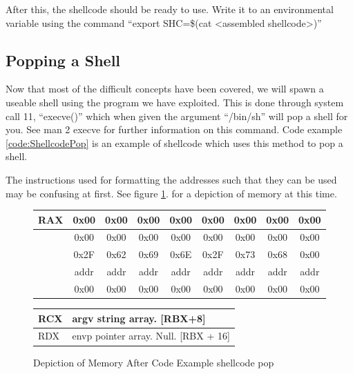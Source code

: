 \documentclass[a4paper,11pt]{report}
\begin{document}
			After this, the shellcode should be ready to use. 
			Write it to an environmental variable using the command ``export SHC=\$(cat <assembled shellcode>)''
		\subsection{Popping a Shell}
			Now that most of the difficult concepts have been covered, we will spawn a useable shell using the program we have exploited. 
			This is done through system call 11, ``execve()'' which when given the argument ``/bin/sh'' will pop a shell for you. 
			See man 2 execve for further information on this command. 
			Code example \ref{code:ShellcodePop} is an example of shellcode which uses this method to pop a shell. 
			\begin{code}
				Assembler}]{./ShellcodePop.asm}
				\caption{Shellcode to Pop a Shell}
				\label{code:ShellcodePop}
			\end{code}
			The instructions used for formatting the addresses such that they can be used may be confusing at first. 
			See figure \ref{fg:ShellPopMemory}. 
			for a depiction of memory at this time. 
			\begin{figure}[htb]
				\centering
				\begin{tabular}{| l | c | c | c | c | c | c | c | c |}
					\hline
					RAX	& 0x00 	& 0x00	& 0x00	& 0x00	& 0x00	& 0x00	& 0x00	& 0x00 \\ \hline
						& 0x00	& 0x00	& 0x00	& 0x00	& 0x00	& 0x00	& 0x00	& 0x00 \\
					\hline
					\hline
					[RBX] 	& 0x2F & 0x62 & 0x69 & 0x6E & 0x2F & 0x73 & 0x68 & 0x00 \\ \hline
						  & addr & addr & addr & addr & addr & addr & addr & addr \\ \hline
						  & 0x00 & 0x00	& 0x00	& 0x00	& 0x00	& 0x00	& 0x00	& 0x00 \\
					\hline
				\end{tabular}
				\begin{tabular}{| l @{ -> } l |}
					\hline
					RCX & argv string array. [RBX+8] \\ \hline
					RDX & envp pointer array. Null. [RBX + 16] \\
					\hline
				\end{tabular}
				\caption[Depiction of memory after shellcode]{Depiction of Memory After Code Example shellcode pop} %
				\label{fg:ShellPopMemory}
			\end{figure}
\end{document}

